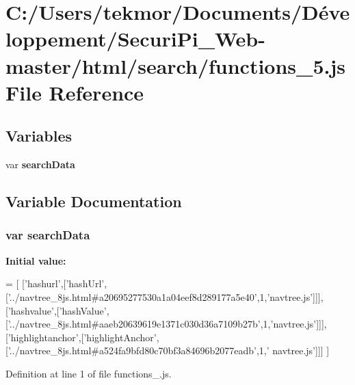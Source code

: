 \section{C\+:/\+Users/tekmor/\+Documents/\+Développement/\+Securi\+Pi\+\_\+\+Web-\/master/html/search/functions\+\_\+5.js File Reference}
\label{functions__5_8js}
\subsection*{Variables}
\begin{DoxyCompactItemize}
\item 
var {\bf search\+Data}
\end{DoxyCompactItemize}


\subsection{Variable Documentation}
\subsubsection[{search\+Data}]{\setlength{\rightskip}{0pt plus 5cm}var search\+Data}\label{functions__5_8js_ad01a7523f103d6242ef9b0451861231e}
{\bfseries Initial value\+:}
\begin{DoxyCode}
=
[
  [\textcolor{stringliteral}{'hashurl'},[\textcolor{stringliteral}{'hashUrl'},[\textcolor{stringliteral}{'../navtree\_8js.html#a20695277530a1a04eef8d289177a5e40'},1,\textcolor{stringliteral}{'navtree.js'}]]],
  [\textcolor{stringliteral}{'hashvalue'},[\textcolor{stringliteral}{'hashValue'},[\textcolor{stringliteral}{'../navtree\_8js.html#aaeb20639619e1371c030d36a7109b27b'},1,\textcolor{stringliteral}{'navtree.js'}]]],
  [\textcolor{stringliteral}{'highlightanchor'},[\textcolor{stringliteral}{'highlightAnchor'},[\textcolor{stringliteral}{'../navtree\_8js.html#a524fa9bfd80c70bf3a84696b2077eadb'},1,\textcolor{stringliteral}{'
      navtree.js'}]]]
]
\end{DoxyCode}


Definition at line 1 of file functions\+\_.\+js.

